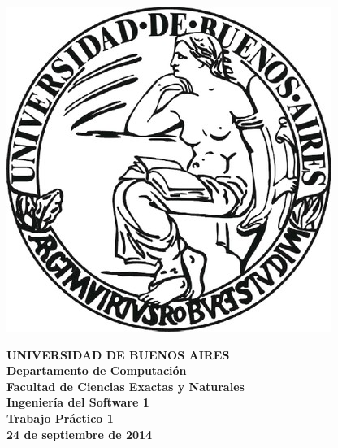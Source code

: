 \documentclass[a4paper]{article}
\begin{document}

\def\Materia{Ingenier\'ia del Software 1}
\def\Titulo{Trabajo Pr\'actico 1}
\def\Fecha{24 de septiembre de 2014}


\thispagestyle{empty}

\begin{center}
	\includegraphics[scale = 0.25]{logo_uba.jpg}
\end{center}

\vspace{5mm}

\begin{center}
	{\textbf{\large UNIVERSIDAD DE BUENOS AIRES}}\\[1.5em]
	{\textbf{\large Departamento de Computaci\'{o}n}}\\[1.5em]
    {\textbf{\large Facultad de Ciencias Exactas y Naturales}}\\
    \vspace{35mm}
    {\LARGE\textbf{\Materia}}\\[1em]    
    \vspace{15mm}
    {\Large \textbf{\Titulo}}\\[1em]
    \vspace{15mm}
    {\textbf{\Large \Fecha}}\\
    \vspace{15mm}
    \textbf{\tablaints}
\end{center}
\end{document}
